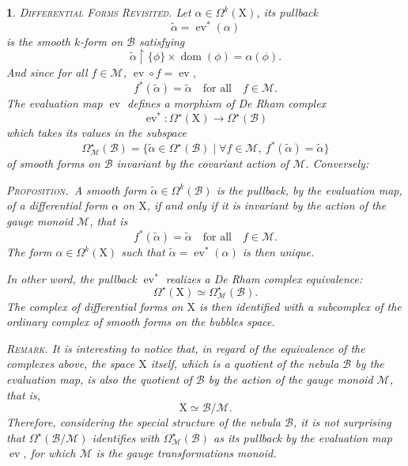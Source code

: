 \documentclass[12pt,reqno]{amsart}
\theoremstyle{article}
\newtheorem{article}{}
\def\artlabel[#1]{\textsc{#1}.}
\def \X{\mathrm X}
\newcommand{\cB}{{\mathcal B}}
\newcommand{\cM}{\mathcal{M}}
\DeclareMathOperator{\dom}{dom}
\DeclareMathOperator{\ev}{ev}
\begin{document}
  \begin{article}\artlabel[Differential Forms Revisited]
    \label{Differential-forms-Revisited}
    Let $\alpha \in \Omega^k(\X)$,
    its pullback
    $$
    \tilde\alpha = \ev^*(\alpha)
    $$
    is the smooth $k$-form on $\cB$ satisfying
    $$
    \tilde\alpha \restriction \{\phi\} \times \dom(\phi) = \alpha(\phi).
    $$
    And since for all $f \in \cM$,
    $\ev \circ f = \ev$,
    $$
    f^*(\tilde\alpha) = \tilde\alpha
    \quad \text{for all} \quad
    f \in \cM.
    $$
    The evaluation map $\ev$ defines a morphism of De Rham complex
    $$
    \ev^* \colon \Omega^\star(\X) \to \Omega^\star(\cB)
    $$
    which takes its values in the subspace
    $$
    \Omega^\star_\cM(\cB) = \{ \tilde\alpha \in \Omega^\star(\cB) \mid \forall f \in \cM, \ f^*(\tilde\alpha) = \tilde\alpha \}
    $$
    of smooth forms on $\cB$ invariant by the covariant action of $\cM$.
    Conversely:
    
    \textsc{Proposition.}~\textit{A smooth form $\tilde \alpha \in \Omega^k(\cB)$ is the pullback,
    by the evaluation map,
    of a differential form $\alpha$ on $\X$,
    if and only if it is invariant by the action of the gauge monoid $\cM$,
    that is
    $$
    f^*(\tilde\alpha) = \tilde\alpha \quad \text{for all} \quad f \in \cM.
    $$
    The form $\alpha \in \Omega^k(\X)$ such that $\tilde\alpha = \ev^*(\alpha)$ is then unique.}
    
    In other word,
    the pullback $\ev^*$ realizes a De Rham complex equivalence:
    $$
    \Omega^\star(\X) \simeq \Omega^\star_\cM(\cB).
    $$
    The complex of differential forms on $\X$ is then identified with a subcomplex of the ordinary complex of smooth forms on the bubbles space.
    
    \textsc{Remark.} It is interesting to notice that,
    in regard of the equivalence of the complexes above,
    the space $\X$ itself,
    which is a quotient of the nebula $\cB$ by the evaluation map,
    is also the quotient of $\cB$ by the action of the gauge monoid $\cM$,
    that is,
    $$
    \X \simeq \cB/\cM.
    $$
    Therefore,
    considering the special structure of the nebula $\cB$,
    it is not surprising that $\Omega^\star(\cB/\cM)$ identifies with $\Omega^\star_\cM(\cB)$ as its pullback by the evaluation map $\ev$,
    for which $\cM$ is the gauge transformations monoid.
    

\end{article}
\end{document}
